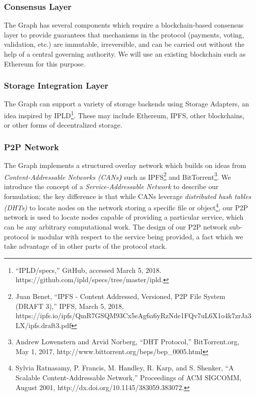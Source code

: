 \documentclass[12pt]{article}
\begin{document}
\subsubsection*{Consensus Layer}
The Graph has several components which require a blockchain-based consensus layer to provide guarantees that mechanisms in the protocol (payments, voting, validation, etc.) are immutable, irreversible, and can be carried out without the help of a central governing authority. We will use an existing blockchain such as Ethereum for this purpose.
\subsubsection*{Storage Integration Layer}
The Graph can support a variety of storage backends using Storage Adapters, an idea inspired by IPLD\footnote{``IPLD/specs,'' GitHub, accessed March 5, 2018. https://github.com/ipld/specs/tree/master/ipld.}. These may include Ethereum, IPFS, other blockchains, or other forms of decentralized storage.
\subsubsection*{P2P Network}
The Graph implements a structured overlay network which builds on ideas from \textit{Content-Addressable Networks (CANs}\textbf{\textit{)}} such as IPFS\footnote{Juan Benet, ``IPFS - Content Addressed, Versioned, P2P File System (DRAFT 3),'' IPFS, March 5, 2018,
https://ipfs.io/ipfs/QmR7GSQM93Cx5eAg6a6yRzNde1FQv7uL6X1o4k7zrJa3LX/ipfs.draft3.pdf} and BitTorrent\footnote{Andrew Lowenstern and Arvid Norberg, ``DHT Protocol,'' BitTorrent.org, May 1, 2017, http://www.bittorrent.org/beps/bep\_0005.html}. We introduce the concept of a \textit{Service-Addressable Network} to describe our formulation; the key difference is that while CANs leverage \textit{distributed hash tables (DHTs)} to locate nodes on the network storing a specific file or object\footnote{Sylvia Ratnasamy, P. Francis, M. Handley, R. Karp, and S. Shenker, ``A Scalable Content-Addressable Network,'' Proceedings of ACM SIGCOMM, August 2001, http://dx.doi.org/10.1145/383059.383072. }, our P2P network is used to locate nodes capable of providing a particular service, which can be any arbitrary computational work. The design of our P2P network sub-protocol is modular with respect to the service being provided, a fact which we take advantage of in other parts of the protocol stack.
\end{document}
